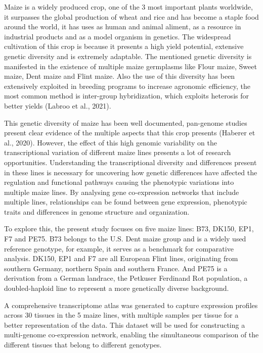 \documentclass[
]{article}
\begin{document}
Maize is a widely produced crop, one of the 3 most important plants
worldwide, it surpasses the global production of wheat and rice and has
become a staple food around the world, it has uses as human and animal
aliment, as a resource in industrial products and as a model organism in
genetics. The widespread cultivation of this crop is because it presents
a high yield potential, extensive genetic diversity and is extremely
adaptable. The mentioned genetic diversity is manifested in the
existence of multiple maize germplasms like Flour maize, Sweet maize,
Dent maize and Flint maize. Also the use of this diversity has been
extensively exploited in breeding programs to increase agronomic
efficiency, the most common method is inter-group hybridization, which
exploits heterosis for better yields (Labroo et al., 2021).

This genetic diversity of maize has been well documented, pan-genome
studies present clear evidence of the multiple aspects that this crop
presents (Haberer et al., 2020). However, the effect of this high
genomic variability on the transcriptional variation of different maize
lines presents a lot of research opportunities. Understanding the
transcriptional diversity and differences present in these lines is
necessary for uncovering how genetic differences have affected the
regulation and functional pathways causing the phenotypic variations
into multiple maize lines. By analysing gene co-expression networks that
include multiple lines, relationships can be found between gene
expression, phenotypic traits and differences in genome structure and
organization.

To explore this, the present study focuses on five maize lines: B73,
DK150, EP1, F7 and PE75. B73 belongs to the U.S. Dent maize group and is
a widely used reference genotype, for example, it serves as a benchmark
for comparative analysis. DK150, EP1 and F7 are all European Flint
lines, originating from southern Germany, northern Spain and southern
France. And PE75 is a derivation from a German landrace, the Petkuser
Ferdinand Rot population, a doubled-haploid line to represent a more
genetically diverse background.

A comprehensive transcriptome atlas was generated to capture expression
profiles across 30 tissues in the 5 maize lines, with multiple samples
per tissue for a better representation of the data. This dataset will be
used for constructing a multi-genome co-expression network, enabling the
simultaneous comparison of the different tissues that belong to
different genotypes.
\end{document}
